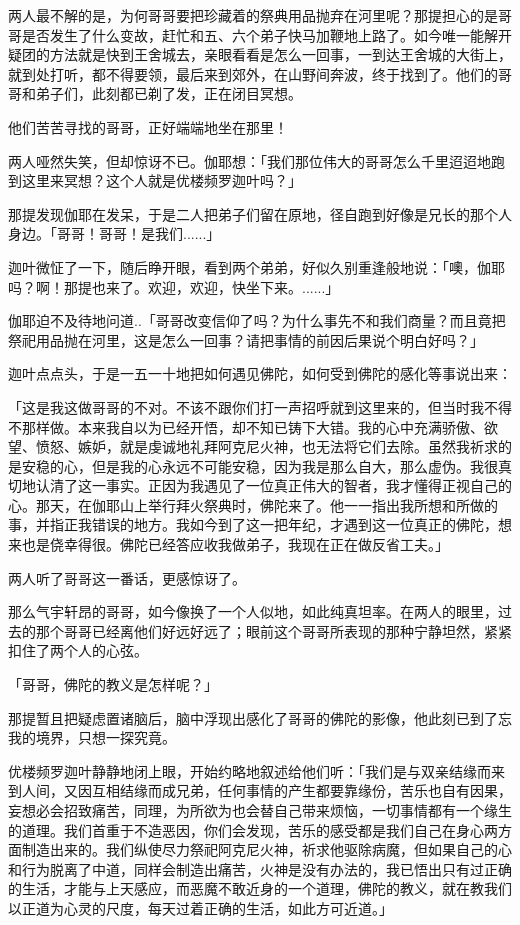 \documentclass[12pt,twoside,openany]{book}
\begin{document}
两人最不解的是，为何哥哥要把珍藏着的祭典用品抛弃在河里呢？那提担心的是哥哥是否发生了什么变故，赶忙和五、六个弟子快马加鞭地上路了。如今唯一能解开疑团的方法就是快到王舍城去，亲眼看看是怎么一回事，一到达王舍城的大街上，就到处打听，都不得要领，最后来到郊外，在山野间奔波，终于找到了。他们的哥哥和弟子们，此刻都已剃了发，正在闭目冥想。

他们苦苦寻找的哥哥，正好端端地坐在那里！

两人哑然失笑，但却惊讶不已。伽耶想：「我们那位伟大的哥哥怎么千里迢迢地跑到这里来冥想？这个人就是优楼频罗迦叶吗？」

那提发现伽耶在发呆，于是二人把弟子们留在原地，径自跑到好像是兄长的那个人身边。「哥哥！哥哥！是我们......」

迦叶微怔了一下，随后睁开眼，看到两个弟弟，好似久别重逢般地说：「噢，伽耶吗？啊！那提也来了。欢迎，欢迎，快坐下来。......」

伽耶迫不及待地问道..「哥哥改变信仰了吗？为什么事先不和我们商量？而且竟把祭祀用品抛在河里，这是怎么一回事？请把事情的前因后果说个明白好吗？」

迦叶点点头，于是一五一十地把如何遇见佛陀，如何受到佛陀的感化等事说出来：

「这是我这做哥哥的不对。不该不跟你们打一声招呼就到这里来的，但当时我不得不那样做。本来我自以为已经开悟，却不知已铸下大错。我的心中充满骄傲、欲望、愤怒、嫉妒，就是虔诚地礼拜阿克尼火神，也无法将它们去除。虽然我祈求的是安稳的心，但是我的心永远不可能安稳，因为我是那么自大，那么虚伪。我很真切地认清了这一事实。正因为我遇见了一位真正伟大的智者，我才懂得正视自己的心。那天，在伽耶山上举行拜火祭典时，佛陀来了。他一一指出我所想和所做的事，并指正我错误的地方。我如今到了这一把年纪，才遇到这一位真正的佛陀，想来也是侥幸得很。佛陀已经答应收我做弟子，我现在正在做反省工夫。」

两人听了哥哥这一番话，更感惊讶了。

那么气宇轩昂的哥哥，如今像换了一个人似地，如此纯真坦率。在两人的眼里，过去的那个哥哥已经离他们好远好远了；眼前这个哥哥所表现的那种宁静坦然，紧紧扣住了两个人的心弦。

「哥哥，佛陀的教义是怎样呢？」

那提暂且把疑虑置诸脑后，脑中浮现出感化了哥哥的佛陀的影像，他此刻已到了忘我的境界，只想一探究竟。

优楼频罗迦叶静静地闭上眼，开始约略地叙述给他们听：「我们是与双亲结缘而来到人间，又因互相结缘而成兄弟，任何事情的产生都要靠缘份，苦乐也自有因果，妄想必会招致痛苦，同理，为所欲为也会替自己带来烦恼，一切事情都有一个缘生的道理。我们首重于不造恶因，你们会发现，苦乐的感受都是我们自己在身心两方面制造出来的。我们纵使尽力祭祀阿克尼火神，祈求他驱除病魔，但如果自己的心和行为脱离了中道，同样会制造出痛苦，火神是没有办法的，我已悟出只有过正确的生活，才能与上天感应，而恶魔不敢近身的一个道理，佛陀的教义，就在教我们以正道为心灵的尺度，每天过着正确的生活，如此方可近道。」
\end{document}
